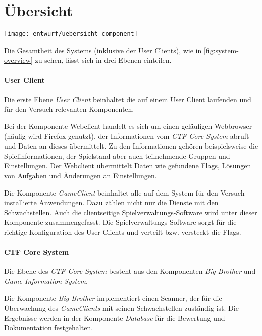 \section{Übersicht} \label{sec:Übersicht}
\begin{center}
	\texttt{[image: entwurf/uebersicht\_component]}
	\label{fig:system-overview}
\end{center}

Die Gesamtheit des Systems (inklusive der User Clients), wie in \autoref{fig:system-overview} zu sehen, lässt sich in drei Ebenen einteilen.

\paragraph{User Client}
Die erste Ebene \textit{User Client} beinhaltet die auf einem User Client laufenden und für den Versuch relevanten Komponenten.

Bei der Komponente Webclient handelt es sich um einen geläufigen Webbrowser (häufig wird Firefox genutzt), der Informationen vom \textit{CTF Core System} abruft und Daten an dieses übermittelt.
Zu den Informationen gehören beispielsweise die Spielinformationen, der Spielstand aber auch teilnehmende Gruppen und Einstellungen. Der Webclient übermittelt Daten wie gefundene Flags, Lösungen von Aufgaben und Änderungen an Einstellungen.

Die Komponente \textit{GameClient} beinhaltet alle auf dem System für den Versuch installierte Anwendungen. Dazu zählen nicht nur die Dienste mit den Schwachstellen. Auch die clientseitige Spielverwaltungs-Software wird unter dieser Komponente zusammengefasst. Die Spielverwaltungs-Software sorgt für die richtige Konfiguration des User Clients und verteilt bzw. versteckt die Flags.

\paragraph{CTF Core System}
Die Ebene des \textit{CTF Core System} besteht aus den Komponenten \textit{Big Brother} und \textit{Game Information System}. 

Die Komponente \textit{Big Brother} implementiert einen Scanner, der für die Überwachung des \textit{GameClients} mit seinen Schwachstellen zuständig ist. Die Ergebnisse werden in der Komponente \textit{Database} für die Bewertung und Dokumentation festgehalten.

